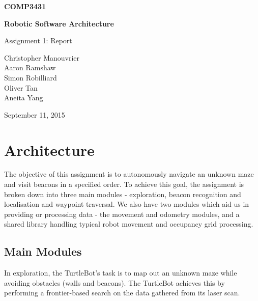 \documentclass[titlepage,12pt,a4paper]{article}
\begin{document}
\begin{titlepage}
    \begin{center}
        \vspace*{3cm}
        
        \Huge
        \textbf{COMP3431\\}
        \title{}
        \vspace{0.5cm}
        \Huge
        \textbf{Robotic Software Architecture}
        
        \vspace{0.54cm}
        
        \Large
        Assignment 1: Report
        
        \vspace{5cm}

	\normalsize
	Christopher Manouvrier\\
	Aaron Ramshaw\\
	Simon Robilliard\\
	Oliver Tan\\
	Aneita Yang
        
	\vfill
        
        \Large
        September 11, 2015
        
    \end{center}
\end{titlepage}

\pagebreak
\tableofcontents

\pagebreak
\section{Architecture}
The objective of this assignment is to autonomously navigate an unknown maze and visit beacons in a specified order. To achieve this goal, the assignment is broken down into three main modules - exploration, beacon recognition and localisation and waypoint traversal. We also have two modules which aid us in providing or processing data - the movement and odometry modules, and a shared library handling typical robot movement and occupancy grid processing.

\subsection{Main Modules}
In exploration, the TurtleBot's task is to map out an unknown maze while avoiding obstacles (walls and beacons). The TurtleBot achieves this by performing a frontier-based search on the data gathered from its laser scan. 
\end{document}
